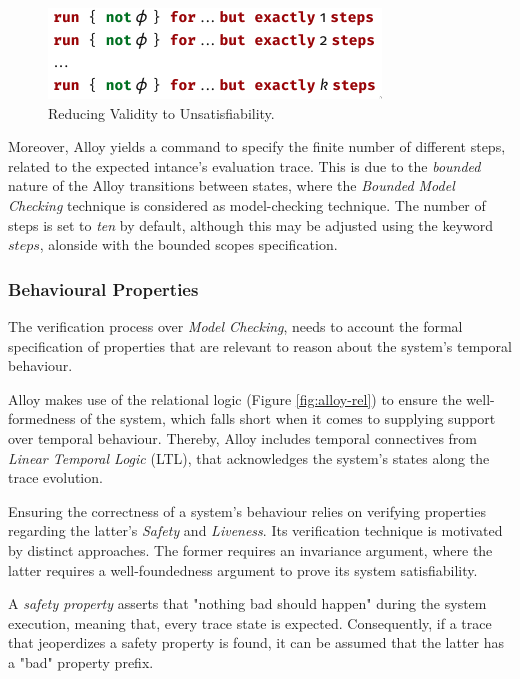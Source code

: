\begin{figure}[H]
    \centering
    \includegraphics[width=0.5\linewidth]{images/check_alloy_2.png}
    \caption{Reducing Validity to Unsatisfiability.}
    \label{fig:alloy-check-2}
\end{figure}

Moreover, Alloy yields a command to specify the finite number of different steps, related to the expected intance's evaluation trace. This is due to the \textit{bounded} nature of the Alloy transitions between states, where the \textit{Bounded Model Checking} technique is considered as model-checking technique. The number of steps is set to \textit{ten} by default, although this may be adjusted using the keyword $steps$, alonside with the bounded scopes specification. 

\subsubsection{Behavioural Properties}

The verification process over \textit{Model Checking}, needs to account the formal specification of properties that are relevant to reason about the system's temporal behaviour. \cite{baier2008principles} 

Alloy makes use of the relational logic (Figure \ref{fig:alloy-rel}) to ensure the well-formedness of the system, which falls short when it comes to supplying support over temporal behaviour. Thereby, Alloy includes temporal connectives from \textit{Linear Temporal Logic} (LTL), that acknowledges the system's states along the trace evolution. \cite{lwspecification, alloy-6, 9341085}

Ensuring the correctness of a system's behaviour relies on verifying properties regarding the latter's \textit{Safety} and \textit{Liveness}. Its verification technique is motivated by distinct approaches. \cite{kindler1994safety} The former requires an invariance argument, where the latter requires a well-foundedness argument to prove its system satisfiability. \cite{alpern1987recognizing}

A \textit{safety property} asserts that "nothing bad should happen" during the system execution, meaning that, every trace state is expected. Consequently, if a trace that jeoperdizes a safety property is found, it can be assumed that the latter has a "bad" property prefix. 

